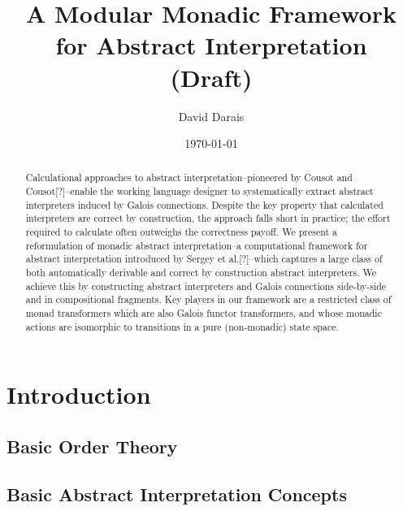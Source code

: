 \documentclass{article}
\title{A Modular Monadic Framework for Abstract Interpretation \\ (Draft)}
\author{David Darais}
\date{\today}
\begin{document}
\maketitle


\begin{abstract}
Calculational approaches to abstract interpretation--pioneered by Cousot and
Cousot[?]--enable the working language designer to systematically extract
abstract interpreters induced by Galois connections. Despite the key property
that calculated interpreters are correct by construction, the approach falls
short in practice; the effort required to calculate often outweighs the
correctness payoff. We present a reformulation of monadic abstract
interpretation--a computational framework for abstract interpretation
introduced by Sergey et al.[?]--which captures a large class of both
automatically derivable and correct by construction abstract interpreters. We
achieve this by constructing abstract interpreters and Galois connections
side-by-side and in compositional fragments. Key players in our framework are a
restricted class of monad transformers which are also Galois functor
transformers, and whose monadic actions are isomorphic to transitions in a pure
(non-monadic) state space.
\end{abstract}


\section{Introduction}

\subsection{Basic Order Theory}







\subsection{Basic Abstract Interpretation Concepts}
\end{document}
